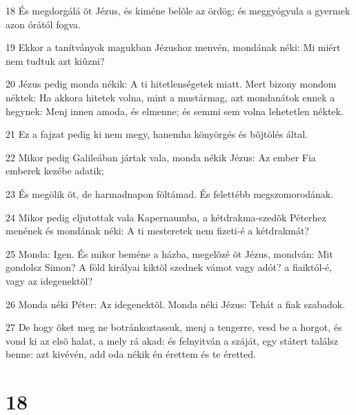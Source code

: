 \par 18 És megdorgálá õt Jézus, és kiméne belõle az ördög; és meggyógyula a gyermek azon órától fogva.
\par 19 Ekkor a tanítványok magukban Jézushoz menvén, mondának néki: Mi miért nem tudtuk azt kiûzni?
\par 20 Jézus pedig monda nékik: A ti hitetlenségetek miatt. Mert bizony mondom néktek: Ha akkora hitetek volna, mint a mustármag, azt mondanátok ennek a hegynek: Menj innen amoda, és elmenne; és semmi sem volna lehetetlen néktek.
\par 21 Ez a fajzat pedig ki nem megy, hanemha könyörgés és bõjtölés által.
\par 22 Mikor pedig Galileában jártak vala, monda nékik Jézus: Az ember Fia emberek kezébe adatik;
\par 23 És megölik õt, de harmadnapon föltámad. És felettébb megszomorodának.
\par 24 Mikor pedig eljutottak vala Kapernaumba, a kétdrakma-szedõk Péterhez menének és mondának néki: A ti mesteretek nem fizeti-é a kétdrakmát?
\par 25 Monda: Igen. És mikor beméne a házba, megelõzé õt Jézus, mondván: Mit gondolsz Simon? A föld királyai kiktõl szednek vámot vagy adót? a fiaiktól-é, vagy az idegenektõl?
\par 26 Monda néki Péter: Az idegenektõl. Monda néki Jézus: Tehát a fiak szabadok.
\par 27 De hogy õket meg ne botránkoztassuk, menj a tengerre, vesd be a horgot, és vond ki az elsõ halat, a mely rá akad: és felnyitván a száját, egy státert találsz benne: azt kivévén, add oda nékik én érettem és te éretted.

\chapter{18}

